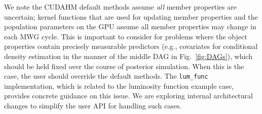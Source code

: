 We note the CUDAHM default methods assume \emph{all} member properties are uncertain; kernel functions that are used for updating member properties and the population parameters on the GPU assume all member properties may change in each MWG cycle.
This is important to consider for problems where the object properties contain precisely measurable predictors (e.g., covariates for conditional density estimation in the manner of the middle DAG in Fig.~\ref{fig:DAGs}), which should be held fixed over the course of posterior simulation.
When this is the case, the user should override the default methods.
The \texttt{lum\_func} implementation, which is related to the luminosity function example case, provides concrete guidance on this issue.
We are exploring internal architectural changes to simplify the user API for handling such cases.

